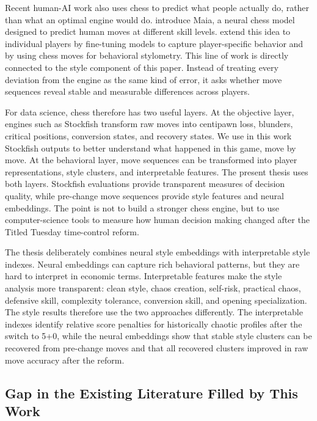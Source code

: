 Recent human-AI work also uses chess to predict what people actually do, rather than what an optimal engine would do. \citet{mcilroyyoung2020maia} introduce Maia, a neural chess model designed to predict human moves at different skill levels. \citet{mcilroyyoung2022individual} extend this idea to individual players by fine-tuning models to capture player-specific behavior and by using chess moves for behavioral stylometry. This line of work is directly connected to the style component of this paper. Instead of treating every deviation from the engine as the same kind of error, it asks whether move sequences reveal stable and measurable differences across players.

For data science, chess therefore has two useful layers. At the objective layer, engines such as Stockfish transform raw moves into centipawn loss, blunders, critical positions, conversion states, and recovery states. We use in this work Stockfish outputs to better understand what happened in this game, move by move. At the behavioral layer, move sequences can be transformed into player representations, style clusters, and interpretable features. The present thesis uses both layers. Stockfish evaluations provide transparent measures of decision quality, while pre-change move sequences provide style features and neural embeddings. The point is not to build a stronger chess engine, but to use computer-science tools to measure how human decision making changed after the Titled Tuesday time-control reform.

The thesis deliberately combines neural style embeddings with interpretable style indexes. Neural embeddings can capture rich behavioral patterns, but they are hard to interpret in economic terms. Interpretable features make the style analysis more transparent: clean style, chaos creation, self-risk, practical chaos, defensive skill, complexity tolerance, conversion skill, and opening specialization. The style results therefore use the two approaches differently. The interpretable indexes identify relative score penalties for historically chaotic profiles after the switch to 5+0, while the neural embeddings show that stable style clusters can be recovered from pre-change moves and that all recovered clusters improved in raw move accuracy after the reform.

\subsection{Gap in the Existing Literature Filled by This Work}

